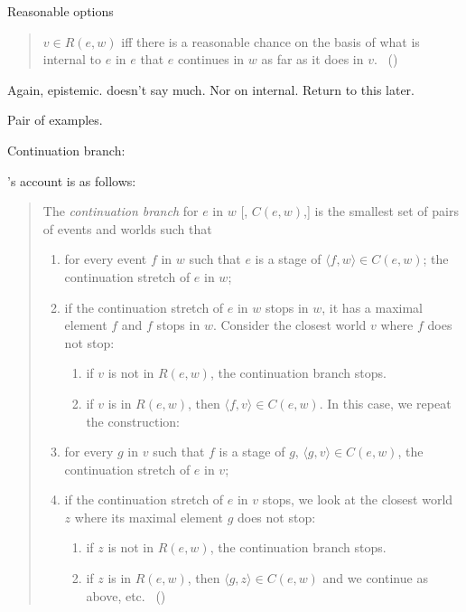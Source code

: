 \begin{note}
  Reasonable options
  \begin{quote}
    \(v \in R(e, w)\) iff there is a reasonable chance on the basis of what is internal to \(e\) in \(e\) that \(e\) continues in \(w\) as far as it does in \(v\).%
    \mbox{ }\hfill\mbox{(\citeyear[26]{Landman:1992wh})}
  \end{quote}
  Again, epistemic.
  \citeauthor{Landman:1992wh} doesn't say much.
  Nor on internal.
  Return to this later.

  Pair of examples.
\end{note}

\begin{note}
  Continuation branch:

  \citeauthor{Landman:1992wh}'s account is as follows:
  \begin{quote}
    The \emph{continuation branch} for \(e\) in \(w\) [, \(C(e,w)\),] is the smallest set of pairs of events and worlds such that
    \begin{enumerate}
    \item
      \label{Landman:CB:continues}
      for every event \(f\) in \(w\) such that \(e\) is a stage of \(\langle f,w \rangle \in C(e,w)\);
      the continuation stretch of \(e\) in \(w\);
    \item
      \label{Landman:CB:stops}
      if the continuation stretch of \(e\) in \(w\) stops in \(w\), it has a maximal element \(f\) and \(f\) stops in \(w\).
      Consider the closest world \(v\) where \(f\) does not stop:
      \begin{enumerate}[label=--]
      \item
        if \(v\) is not in \(R(e, w)\), the continuation branch stops.
      \item
        if \(v\) is in \(R(e, w)\), then \(\langle f,v \rangle \in C(e,w)\).
        In this case, we repeat the construction:
      \end{enumerate}
    \item
      \label{Landman:CB:continues:again}
      for every \(g\) in \(v\) such that \(f\) is a stage of \(g\), \(\langle g,v \rangle \in C(e,w)\), the continuation stretch of \(e\) in \(v\);
    \item
      \label{Landman:CB:stops:again}
      if the continuation stretch of \(e\) in \(v\) stops, we look at the closest world \(z\) where its maximal element \(g\) does not stop:
      \begin{enumerate}[label=--]
      \item
        if \(z\) is not in \(R(e, w)\), the continuation branch stops.
      \item
        if \(z\) is in \(R(e, w)\), then \(\langle g,z \rangle \in C(e,w)\) and we continue as above, etc.%
        \mbox{ }\hfill\mbox{(\citeyear[26--27]{Landman:1992wh})}
      \end{enumerate}
    \end{enumerate}
  \end{quote}


\end{note}

